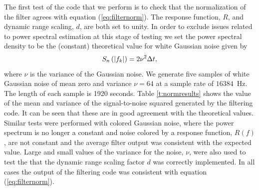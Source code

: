 The first test of the code that we perform is to check that the normalization
of the filter agrees with equation (\ref{eq:filternorm}). The response
function, $R$, and dynamic range scaling, $d$, are both set to unity. In order
to exclude issues related to power spectral estimation at this stage of
testing  we set the power spectral density to be the (constant) theoretical
value for white Gaussian noise given by
\begin{equation}
S_n\left(\left|f_{k}\right|\right) = 2 \nu^2 \Delta t,
\label{eq:gaussianpsd}
\end{equation}
where $\nu$ is the variance of the Gaussian noise.  We generate five samples
of white Gaussian noise of mean zero and variance $\nu = 64$ at a sample rate
of $16384$~Hz. The length of each sample is 1920 seconds. Table
\ref{t:normresults} shows the value of the mean and variance of the
signal-to-noise squared generated by the filtering code. It can be seen that
these are in good agreement with the theoretical values. Similar tests were
performed with colored Gaussian noise, where the power spectrum is no longer a
constant and noise colored by a response function, $R(f)$, are not constant
and the average filter output was consistent with the expected value.  Large
and small values of the variance for the noise, $\nu$, were also used to test
the that the dynamic range scaling factor $d$ was correctly implemented. In
all cases the output of the filtering code was consistent with equation
(\ref{eq:filternorm}).


